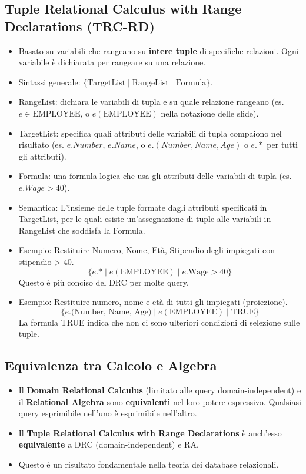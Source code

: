 \documentclass{article}
\begin{document}
	\subsection{Tuple Relational Calculus with Range Declarations (TRC-RD)}
	\begin{itemize}
		\item Basato su variabili che rangeano su \textbf{intere tuple} di specifiche relazioni. Ogni variabile è dichiarata per rangeare su una relazione.
		\item Sintassi generale: $\{ \text{TargetList} \mid \text{RangeList} \mid \text{Formula} \}$.
		\item RangeList: dichiara le variabili di tupla e su quale relazione rangeano (es. $e \in \text{EMPLOYEE}$, o $e(\text{EMPLOYEE})$ nella notazione delle slide).
		\item TargetList: specifica quali attributi delle variabili di tupla compaiono nel risultato (es. $e.Number$, $e.Name$, o $e.(Number, Name, Age)$ o $e.*$ per tutti gli attributi).
		\item Formula: una formula logica che usa gli attributi delle variabili di tupla (es. $e.Wage > 40$).
		\item Semantica: L'insieme delle tuple formate dagli attributi specificati in TargetList, per le quali esiste un'assegnazione di tuple alle variabili in RangeList che soddisfa la Formula.
		\item Esempio: Restituire Numero, Nome, Età, Stipendio degli impiegati con stipendio > 40.
		$$ \{ e.\text{*} \mid e(\text{EMPLOYEE}) \mid e.\text{Wage} > 40 \} $$
		Questo è più conciso del DRC per molte query.
		\item Esempio: Restituire numero, nome e età di tutti gli impiegati (proiezione).
		$$ \{ e.\text{(Number, Name, Age)} \mid e(\text{EMPLOYEE}) \mid \text{TRUE} \} $$
		La formula TRUE indica che non ci sono ulteriori condizioni di selezione sulle tuple.
	\end{itemize}
	
	\subsection{Equivalenza tra Calcolo e Algebra}
	\begin{itemize}
		\item Il \textbf{Domain Relational Calculus} (limitato alle query domain-independent) e il \textbf{Relational Algebra} sono \textbf{equivalenti} nel loro potere espressivo. Qualsiasi query esprimibile nell'uno è esprimibile nell'altro.
		\item Il \textbf{Tuple Relational Calculus with Range Declarations} è anch'esso \textbf{equivalente} a DRC (domain-independent) e RA.
		\item Questo è un risultato fondamentale nella teoria dei database relazionali.
	\end{itemize}
	
\end{document}
